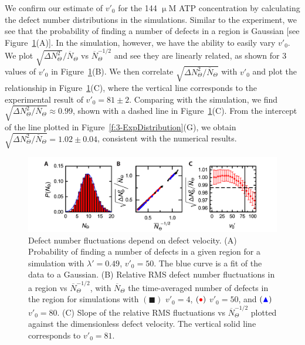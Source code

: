We confirm our estimate of $v'_0$ for the 144 $\upmu$M ATP concentration by calculating the defect number distributions in the simulations.
Similar to the experiment, we see that the probability of finding a number of defects in a region is Gaussian [see Figure~\ref{f:3-MatchDist}(A)].
In the simulation, however, we have the ability to easily vary $v'_0$.
We plot $\displaystyle{\sqrt{\Delta N_{\Theta}^2}} \bigg / \displaystyle {\overbar{N}_{\Theta}}$ vs $\overbar{N}_{\Theta}^{-1/2}$ and see they are linearly related, as shown for 3 values of $v'_0$ in Figure~\ref{f:3-MatchDist}(B).
We then correlate $\displaystyle \sqrt{\Delta N_{\Theta}^2 \big / \overbar{N}_{\Theta}}$ with $v'_0$ and plot the relationship in Figure~\ref{f:3-MatchDist}(C), where the vertical line corresponds to the experimental result of $v'_0 = 81 \pm 2$.
Comparing with the simulation, we find $\displaystyle \sqrt{\Delta N_{\Theta}^2 \big / \overbar{N}_{\Theta}} \approx 0.99$, shown with a dashed line in Figure~\ref{f:3-MatchDist}(C).
From the intercept of the line plotted in Figure~\ref{f:3-ExpDistribution}(G), we obtain $\displaystyle \sqrt{\Delta N_{\Theta}^2 \big / \overbar{N}_{\Theta}} = 1.02 \pm 0.04$, consistent with the numerical results.
\begin{figure}
  \centering
  \includegraphics{figures/C3/Ch3-Figs_MatchDist.png}
  \caption{Defect number fluctuations depend on defect velocity.
  (A) Probability of finding a number of defects in a given region for a simulation with $\lambda' = 0.49$, $v'_0 = 50$. The blue curve is a fit of the data to a Gaussian.
  (B) Relative RMS defect number fluctuations in a region vs $\overbar{N}_{\Theta}^{-1/2}$, with $\overbar{N}_{\Theta}$ the time-averaged number of defects in the region for simulations with
  $({\blacksquare})$ $v'_0 = 4$,
  $({\color{red} \bullet})$ $v'_0 = 50$, and
  $({\color{blue} \blacktriangle})$ $v'_0 = 80$.
  (C) Slope of the relative RMS fluctuations vs $\overbar{N}_{\Theta}^{-1/2}$ plotted against the dimensionless defect velocity. The vertical solid line corresponds to $v'_0 = 81$.}\label{f:3-MatchDist}
\end{figure}

